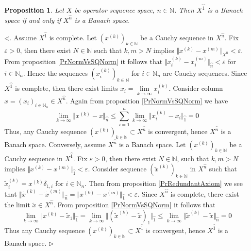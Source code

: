 \documentclass[12pt]{article}
\newtheorem{proposition}[theorem]{Proposition}
\newenvironment{proof}{\par $\triangleleft$}{$\triangleright$}
\begin{document}
\begin{proposition}\label{PrSQSpaceComplSoAmplISCompl}
Let $X$ be operator sequence space, $n\in\mathbb{N}$. Then $X^{\wideparen{1}}$ is a Banach space  if and only if  $X^{\wideparen{n}}$ is a Banach space.
\end{proposition}
\begin{proof}. Assume $X^{\wideparen{1}}$ is complete. Let $(x^{(k)})_{k\in\mathbb{N}}$ be a Cauchy sequence in $X^{\wideparen{n}}$. Fix $\varepsilon>0$, then there exist $N\in\mathbb{N}$ such that $k,m> N$ 
implies $\Vert x^{(k)}-x^{(m)}\Vert_{X^{\wideparen{n}}}<\varepsilon$. From proposition \ref{PrNormVsSQNorm} it follows that $\Vert x_i^{(k)}-x_i^{(m)}\Vert_{\wideparen{n}}<\varepsilon$ for $i\in\mathbb{N}_n$. Hence the sequences 
$(x_i^{(k)})_{k\in\mathbb{N}}$ for $i\in\mathbb{N}_n$ are Cauchy sequences. Since $X^{\wideparen{1}}$ is complete, then there exist limits $x_i=\lim\limits_{k\to\infty}x_i^{(k)}$. Consider column $x=(x_i)_{i\in\mathbb{N}_n}\in  X^{\wideparen{n}}$. 
Again from proposition \ref{PrNormVsSQNorm} we have
$$
\lim_{k\to\infty}\Vert x^{(k)}-x\Vert_{\wideparen{n}}\leq\sum\limits_{i=1}^n\lim\limits_{k\to\infty}\Vert x_i^{(k)}-x_i\Vert_{\wideparen{1}}=0
$$
Thus, any Cauchy sequence $(x^{(k)})_{k\in\mathbb{N}}\subset X^{\wideparen{n}}$ is convergent, hence $X^{\wideparen{n}}$ is a Banach space. Conversely, assume $X^{\wideparen{n}}$ is a Banach space. Let $(x^{(k)})_{k\in\mathbb{N}}$ 
be a Cauchy sequence in $X^{\wideparen{1}}$. Fix $\varepsilon>0$, then there exist $N\in\mathbb{N}$, such that $k,m> N$ implies $\Vert x^{(k)}-x^{(m)}\Vert_{\wideparen{1}}<\varepsilon$.  Consider sequence 
$(\tilde{x}^{(k)})_{k\in\mathbb{N}}$ in $X^{\wideparen{n}}$ such that $\tilde{x}_i^{(k)}=x^{(k)}\delta_{1,i}$ for $i\in\mathbb{N}_n$. Then from proposition \ref{PrRedundantAxiom} we see that 
$\Vert \tilde{x}^{(k)}-\tilde{x}^{(m)}\Vert_{\wideparen{n}}=\Vert x^{(k)}-x^{(m)}\Vert_{\wideparen{1}}<\varepsilon$. Since $X^{\wideparen{n}}$ is complete, there exist the limit $\tilde{x}\in X^{\wideparen{n}}$. From proposition 
\ref{PrNormVsSQNorm} it follows that
$$
\lim\limits_{k\to\infty}\Vert x^{(k)}-\tilde{x}_1\Vert_{\wideparen{1}}
=\lim\limits_{k\to\infty}\Vert (\tilde{x}^{(k)}-\tilde{x})_1\Vert_{\wideparen{1}}
\leq\lim\limits_{k\to\infty}\Vert \tilde{x}^{(k)}-\tilde{x}\Vert_{\wideparen{n}}=0
$$
Thus any Cauchy sequence $(x^{(k)})_{k\in\mathbb{N}}\subset X^{\wideparen{1}}$ is convergent, hence $X^{\wideparen{1}}$ is a Banach space. 
\end{proof}
\end{document}
